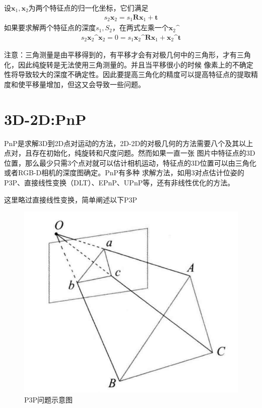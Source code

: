\documentclass[10pt]{article}
\begin{document}
设$\mathbf{x}_1,\mathbf{x}_2$为两个特征点的归一化坐标，它们满足
\begin{align} 
    s_2\mathbf{x}_2=s_1\mathbf{R}\mathbf{x}_1+\mathbf{t}
\end{align}
如果要求解两个特征点的深度$s_1,S_2$，在两式左乘一个$\mathbf{x}_{2}\sphat$
\begin{align} 
    s_2\mathbf{x}_{2}\sphat\mathbf{x}_{2}=0=s_1\mathbf{x}_2\sphat\mathbf{R}\mathbf{x}_1+\mathbf{x}_{2}
    \sphat\mathbf{t}
\end{align}

注意：三角测量是由平移得到的，有平移才会有对极几何中的三角形，才有三角化，因此纯旋转是无法使用三角测量的。并且当平移很小的时候
像素上的不确定性将导致较大的深度不确定性。因此要提高三角化的精度可以提高特征点的提取精度和使平移量增加，但这又会导致一些问题。

\section{3D-2D:PnP}
PnP是求解3D到2D点对运动的方法，2D-2D的对极几何的方法需要八个及其以上点对，且存在初始化，纯旋转和尺度问题。然而如果一直一张
图片中特征点的3D位置，那么最少只需3个点对就可以估计相机运动，特征点的3D位置可以由三角化或者RGB-D相机的深度图确定。PnP有多种
求解方法，如用3对点估计位姿的P3P、直接线性变换（DLT）、EPnP、UPnP等，还有非线性优化的方法。

这里略过直接线性变换，简单阐述以下P3P
\begin{figure}[!htb]
    \centering
    \includegraphics[scale=1]{images/P3P.png}
    \caption{P3P问题示意图}    
\end{figure}
\end{document}

